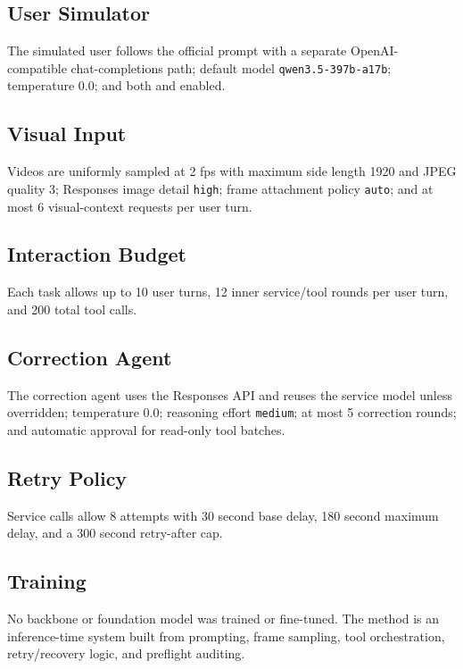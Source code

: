 \documentclass[sigconf,nonacm]{acmart}
\begin{document}
\subsection{User Simulator}

The simulated user follows the official prompt with a separate OpenAI-compatible
chat-completions path; default model \texttt{qwen3.5-397b-a17b}; temperature 0.0;
and both  and  enabled.

\subsection{Visual Input}

Videos are uniformly sampled at 2 fps with maximum side length 1920 and JPEG
quality 3; Responses image detail \texttt{high}; frame attachment policy
\texttt{auto}; and at most 6 visual-context requests per user turn.

\subsection{Interaction Budget}

Each task allows up to 10 user turns, 12 inner service/tool rounds per user
turn, and 200 total tool calls.

\subsection{Correction Agent}

The correction agent uses the Responses API and reuses the service model unless
overridden; temperature 0.0; reasoning effort \texttt{medium}; at most 5
correction rounds; and automatic approval for read-only tool batches.

\subsection{Retry Policy}

Service calls allow 8 attempts with 30 second base delay, 180 second maximum
delay, and a 300 second retry-after cap.

\subsection{Training}

No backbone or foundation model was trained or fine-tuned. The method is an
inference-time system built from prompting, frame sampling, tool orchestration,
retry/recovery logic, and preflight auditing.
\end{document}
